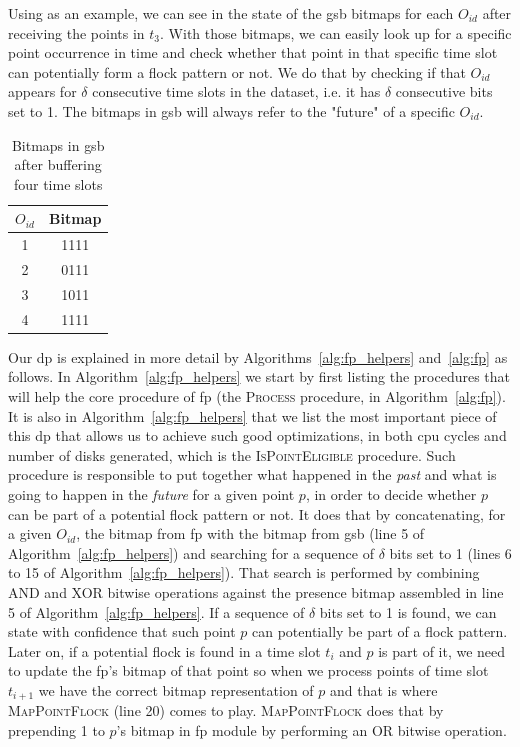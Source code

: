 Using  as an example, we can see in  the state of the \ac{gsb} bitmaps for each
$O_{id}$ after receiving the points in $t_3$. With those bitmaps, we can easily look up for a specific point occurrence
in time and check whether that point in that specific time slot can potentially form a flock pattern or not. We do that
by checking if that $O_{id}$ appears for $\delta$ consecutive time slots in the dataset, i.e. it has $\delta$
consecutive bits set to 1. The bitmaps in \ac{gsb} will always refer to the "future" of a specific $O_{id}$.

\begin{table}[h!]
    \renewcommand{\arraystretch}{1.3}
    \caption{Bitmaps in \ac{gsb} after buffering four time slots}
    \label{tab:bitmaps}
    \centering
    \begin{tabular}{c | c}
        \toprule
        $O_{id}$ &   Bitmap\\
        \toprule
        1        &   1111\\
        \bottomrule
        2        &   0111\\
        \bottomrule
        3        &   1011\\
        \bottomrule
        4        &   1111\\
        \bottomrule
    \end{tabular}
\end{table}

Our \ac{dp} is explained in more detail by Algorithms~\ref{alg:fp_helpers} and~\ref{alg:fp} as follows. In
Algorithm~\ref{alg:fp_helpers} we start by first listing the procedures that will help the core procedure of \ac{fp}
(the \textsc{Process} procedure, in Algorithm~\ref{alg:fp}). It is also in Algorithm~\ref{alg:fp_helpers} that we list
the most important piece of this \ac{dp} that allows us to achieve such good optimizations, in both \ac{cpu} cycles and
number of disks generated, which is the \textsc{IsPointEligible} procedure. Such procedure is responsible to put
together what happened in the \textit{past} and what is going to happen in the \textit{future} for a given point $p$, in
order to decide whether $p$ can be part of a potential flock pattern or not. It does that by concatenating, for a given
$O_{id}$, the bitmap from \ac{fp} with the bitmap from \ac{gsb} (line 5 of Algorithm~\ref{alg:fp_helpers}) and searching
for a sequence of $\delta$ bits set to 1 (lines 6 to 15 of Algorithm~\ref{alg:fp_helpers}). That search is performed by
combining AND and XOR bitwise operations against the presence bitmap assembled in line 5 of
Algorithm~\ref{alg:fp_helpers}. If a sequence of $\delta$ bits set to 1 is found, we can state with confidence that such
point $p$ can potentially be part of a flock pattern. Later on, if a potential flock is found in a time slot $t_i$ and
$p$ is part of it, we need to update the \ac{fp}'s bitmap of that point so when we process points of time slot $t_{i+1}$
we have the correct bitmap representation of $p$ and that is where \textsc{MapPointFlock} (line 20) comes to play.
\textsc{MapPointFlock} does that by prepending 1 to $p$'s bitmap in \ac{fp} module by performing an OR bitwise
operation.

